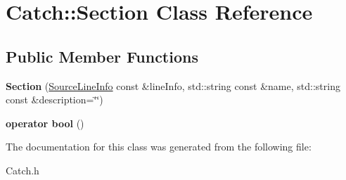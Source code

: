 \hypertarget{class_catch_1_1_section}{\section{Catch\-:\-:Section Class Reference}
\label{class_catch_1_1_section}
}
\subsection*{Public Member Functions}
\begin{DoxyCompactItemize}
\item 
\hypertarget{class_catch_1_1_section_a198fc28fb53ab34a3fa228503161ad6b}{{\bfseries Section} (\hyperlink{struct_catch_1_1_source_line_info}{Source\-Line\-Info} const \&line\-Info, std\-::string const \&name, std\-::string const \&description=\char`\"{}\char`\"{})}\label{class_catch_1_1_section_a198fc28fb53ab34a3fa228503161ad6b}

\item 
\hypertarget{class_catch_1_1_section_ac9a2be9ed0b2248f8b9c4c06efde4a29}{{\bfseries operator bool} ()}\label{class_catch_1_1_section_ac9a2be9ed0b2248f8b9c4c06efde4a29}

\end{DoxyCompactItemize}


The documentation for this class was generated from the following file\-:\begin{DoxyCompactItemize}
\item 
Catch.\-h\end{DoxyCompactItemize}
